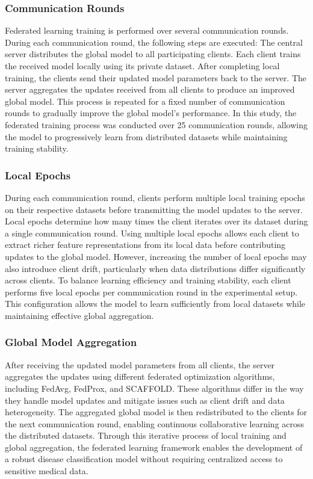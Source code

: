 \documentclass[12pt]{book}
\begin{document}
\subsubsection{Communication Rounds}
Federated learning training is performed over several communication rounds. During each communication round, the following steps are executed:
The central server distributes the global model to all participating clients.
Each client trains the received model locally using its private dataset.
After completing local training, the clients send their updated model parameters back to the server.
The server aggregates the updates received from all clients to produce an improved global model.
This process is repeated for a fixed number of communication rounds to gradually improve the global model's performance. In this study, the federated training process was conducted over 25 communication rounds, allowing the model to progressively learn from distributed datasets while maintaining training stability.
\subsubsection{Local Epochs}
During each communication round, clients perform multiple local training epochs on their respective datasets before transmitting the model updates to the server. Local epochs determine how many times the client iterates over its dataset during a single communication round.
Using multiple local epochs allows each client to extract richer feature representations from its local data before contributing updates to the global model. However, increasing the number of local epochs may also introduce client drift, particularly when data distributions differ significantly across clients.
To balance learning efficiency and training stability, each client performs five local epochs per communication round in the experimental setup. This configuration allows the model to learn sufficiently from local datasets while maintaining effective global aggregation.
\subsubsection{Global Model Aggregation}
After receiving the updated model parameters from all clients, the server aggregates the updates using different federated optimization algorithms, including FedAvg, FedProx, and SCAFFOLD. These algorithms differ in the way they handle model updates and mitigate issues such as client drift and data heterogeneity.
The aggregated global model is then redistributed to the clients for the next communication round, enabling continuous collaborative learning across the distributed datasets.
Through this iterative process of local training and global aggregation, the federated learning framework enables the development of a robust disease classification model without requiring centralized access to sensitive medical data.\
\end{document}

